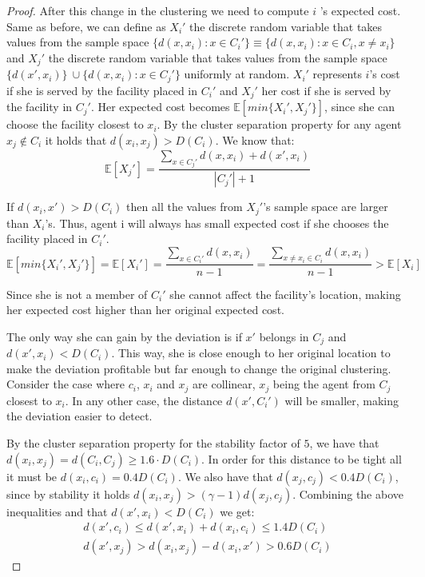 \begin{proof}
After this change in the clustering we need to compute $i$
's expected cost. Same as before, we can define as $X_i'$ the discrete random variable that takes values from the sample space $\{ d(x,x_i): x\in C_i' \}  \equiv \{ d(x,x_i): x\in C_i, x\neq x_i \}$ and $X_j'$ the discrete random variable that takes values from the sample space $\{d(x',x_i)\} \	\cup \{ d(x,x_i): x\in C_j'\}$ uniformly at random. $X_i'$ represents $i$'s cost if she is served by the facility placed in $C_i'$ and $X_j'$ her cost if she is served by the facility in $C_j'$. Her expected cost becomes $\mathbb{E} [min\{ X_i', X_j' \}]$, since she can choose the facility closest to $x_i$. 
By the cluster separation property for any agent $x_j \notin C_i$ it holds that $d(x_i,x_j)>D(C_i)$.  We know that: 
\[\mathbb{E}[X_j'] =  \frac{\sum_{x \in C_j'} d(x,x_i) + d(x',x_i)}{|C_j'|+1}\]

If $d(x_i,x') > D(C_i)$ then all the values from $X_j'$'s sample space are larger than  $X_i$'s. Thus, agent i will always has small expected cost if she chooses the facility placed in $C_i'$. 
\[\mathbb{E}[min\{X_i',X_j'\}] = \mathbb{E}[X_i'] = \frac{\sum_{x \in C_i'} d(x,x_i)}{n-1} = \frac{\sum_{x \neq x_i\in C_i} d(x,x_i)}{n-1} > \mathbb{E}[X_i]\]

Since she is not a member of $C_i'$ she cannot affect the facility's location, making her expected cost higher than her original expected cost.
\bigskip

The only way she can gain by the deviation is if $x'$ belongs in $C_j$ and $d(x',x_i)<D(C_i)$. This way, she is close enough to her original location to make the deviation profitable but far enough to change the original clustering. Consider the case where $c_i$, $x_i$ and $x_j$ are collinear, $x_j$ being the agent from $C_j$ closest to $x_i$. In any other case, the distance $d(x',C_i')$ will be smaller, making the deviation easier to detect. 

By the cluster separation property for the stability factor of $5$, we have that  $d(x_i,x_j) = d(C_i,C_j) \ge 1.6\cdot D(C_i)$. In order for this distance to be tight all it must be $d(x_i,c_i) = 0.4D(C_i)$. We also have that $d(x_j,c_j) < 0.4D(C_i)$, since by stability it holds $d(x_i,x_j) > (\gamma-1)d(x_j,c_j)$. Combining the above inequalities and that $d(x',x_i)<D(C_i)$ we get:
\begin{align}
d(x',c_i) \le d(x',x_i) + d(x_i,c_i) \le 1.4D(C_i) \\
d(x',x_j)>d(x_i,x_j) - d(x_i,x') > 0.6D(C_i)
\end{align}



\end{proof}

